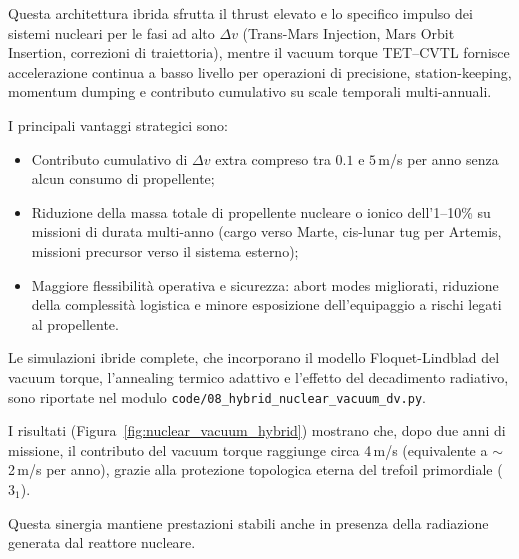 \documentclass[11pt,a4paper]{article}
\let\oldref\ref
\renewcommand{\ref}{\protect\oldref}
\theoremstyle{plain}
\theoremstyle{definition}
\begin{document}
\vspace{0.4cm}

Questa architettura ibrida sfrutta il thrust elevato e lo specifico impulso dei sistemi nucleari per le fasi ad alto $\Delta v$ (Trans-Mars Injection, Mars Orbit Insertion, correzioni di traiettoria), mentre il vacuum torque TET--CVTL fornisce accelerazione continua a basso livello per operazioni di precisione, station-keeping, momentum dumping e contributo cumulativo su scale temporali multi-annuali.


\vspace{0.5cm}

I principali vantaggi strategici sono:


\vspace{0.2cm}
\begin{itemize}
    \item Contributo cumulativo di $\Delta v$ extra compreso tra $0.1$ e $5$\,m/s per anno senza alcun consumo di propellente;


    \vspace{0.2cm}
    \item Riduzione della massa totale di propellente nucleare o ionico dell’1--10\% su missioni di durata multi-anno (cargo verso Marte, cis-lunar tug per Artemis, missioni precursor verso il sistema esterno);



    \vspace{0.2cm}
    \item Maggiore flessibilità operativa e sicurezza: abort modes migliorati, riduzione della complessità logistica e minore esposizione dell’equipaggio a rischi legati al propellente.
\end{itemize}


\vspace{0.4cm}

Le simulazioni ibride complete, che incorporano il modello Floquet-Lindblad del vacuum torque, l’annealing termico adattivo e l’effetto del decadimento radiativo, sono riportate nel modulo \texttt{code/08\_hybrid\_nuclear\_vacuum\_dv.py}. 


\vspace{0.4cm}
I risultati (Figura~\ref{fig:nuclear_vacuum_hybrid}) mostrano che, dopo due anni di missione, il contributo del vacuum torque raggiunge circa 4\,m/s (equivalente a $\sim$2\,m/s per anno), grazie alla protezione topologica eterna del trefoil primordiale ($3_1$). 

\vspace{0.5cm}
Questa sinergia mantiene prestazioni stabili anche in presenza della radiazione generata dal reattore nucleare.
\end{document}
